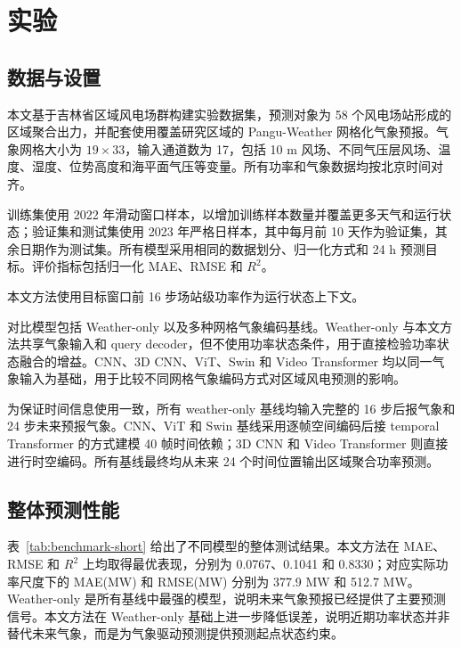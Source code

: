 \section{实验}

\subsection{数据与设置}

本文基于吉林省区域风电场群构建实验数据集，预测对象为 58 个风电场站形成的区域聚合出力，并配套使用覆盖研究区域的 Pangu-Weather 网格化气象预报。气象网格大小为 \(19\times33\)，输入通道数为 17，包括 10 m 风场、不同气压层风场、温度、湿度、位势高度和海平面气压等变量。所有功率和气象数据均按北京时间对齐。

训练集使用 2022 年滑动窗口样本，以增加训练样本数量并覆盖更多天气和运行状态；验证集和测试集使用 2023 年严格日样本，其中每月前 10 天作为验证集，其余日期作为测试集。所有模型采用相同的数据划分、归一化方式和 24 h 预测目标。评价指标包括归一化 MAE、RMSE 和 \(R^2\)。

本文方法使用目标窗口前 16 步场站级功率作为运行状态上下文。

对比模型包括 Weather-only 以及多种网格气象编码基线。Weather-only 与本文方法共享气象输入和 query decoder，但不使用功率状态条件，用于直接检验功率状态融合的增益。CNN、3D CNN、ViT、Swin 和 Video Transformer 均以同一气象输入为基础，用于比较不同网格气象编码方式对区域风电预测的影响。

为保证时间信息使用一致，所有 weather-only 基线均输入完整的 16 步后报气象和 24 步未来预报气象。CNN、ViT 和 Swin 基线采用逐帧空间编码后接 temporal Transformer 的方式建模 40 帧时间依赖；3D CNN 和 Video Transformer 则直接进行时空编码。所有基线最终均从未来 24 个时间位置输出区域聚合功率预测。

\subsection{整体预测性能}

表~\ref{tab:benchmark-short} 给出了不同模型的整体测试结果。本文方法在 MAE、RMSE 和 \(R^2\) 上均取得最优表现，分别为 0.0767、0.1041 和 0.8330；对应实际功率尺度下的 MAE(MW) 和 RMSE(MW) 分别为 377.9 MW 和 512.7 MW。Weather-only 是所有基线中最强的模型，说明未来气象预报已经提供了主要预测信号。本文方法在 Weather-only 基础上进一步降低误差，说明近期功率状态并非替代未来气象，而是为气象驱动预测提供预测起点状态约束。

